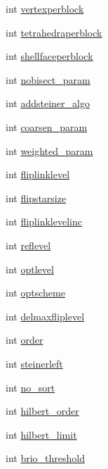 \begin{DoxyCompactItemize}
\item 
int \hyperlink{classtetgenbehavior_a0706697ee85e4d4c7ea4b581df3c0786}{vertexperblock}
\item 
int \hyperlink{classtetgenbehavior_a8780a33de02550bb0197026cc4fa4dca}{tetrahedraperblock}
\item 
int \hyperlink{classtetgenbehavior_ade48168b9a70a4aacf9ef7ed52e967fe}{shellfaceperblock}
\item 
int \hyperlink{classtetgenbehavior_a6a331aa8b36d3f8dfee8b7fd8102520a}{nobisect\-\_\-param}
\item 
int \hyperlink{classtetgenbehavior_a660e5666e236d2e0fbd127fd56c9c493}{addsteiner\-\_\-algo}
\item 
int \hyperlink{classtetgenbehavior_a7280448201faf01cb571b2d1d09941f1}{coarsen\-\_\-param}
\item 
int \hyperlink{classtetgenbehavior_af7f32fedb214eab9b328974e2b564437}{weighted\-\_\-param}
\item 
int \hyperlink{classtetgenbehavior_a6fe8bf0c7357859461d45082caf4ee70}{fliplinklevel}
\item 
int \hyperlink{classtetgenbehavior_a4221b8b36b08a2a4107104cc959add20}{flipstarsize}
\item 
int \hyperlink{classtetgenbehavior_ae81513eea64eef16010a7bb998df3d5f}{fliplinklevelinc}
\item 
int \hyperlink{classtetgenbehavior_aedcb3e57800acfb18eb9a31766cf8477}{reflevel}
\item 
int \hyperlink{classtetgenbehavior_ae6d1777b2e5f9dad3921c778fc735717}{optlevel}
\item 
int \hyperlink{classtetgenbehavior_a4e5be08acac6b661a03e57efedd83ac9}{optscheme}
\item 
int \hyperlink{classtetgenbehavior_a4da6a5712b049c2bd9585fb6fe1d6cba}{delmaxfliplevel}
\item 
int \hyperlink{classtetgenbehavior_a47550f681968e6674f3c78b395d59df8}{order}
\item 
int \hyperlink{classtetgenbehavior_af6347b10c32052915e93e693d5cd687a}{steinerleft}
\item 
int \hyperlink{classtetgenbehavior_aa028ef7527ddb92cf8be45596424dd2f}{no\-\_\-sort}
\item 
int \hyperlink{classtetgenbehavior_a24291eedf8d006b92321d07d466fa19a}{hilbert\-\_\-order}
\item 
int \hyperlink{classtetgenbehavior_ad77c5217ba8b78246f179eb1f98df22f}{hilbert\-\_\-limit}
\item 
int \hyperlink{classtetgenbehavior_a0fae1ef28e8ba36da70912c73e5cc8b5}{brio\-\_\-threshold}

\end{DoxyCompactItemize}
